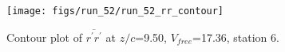 \begin{figure}[H]
\centering
\texttt{[image: figs/run\_52/run\_52\_rr\_contour]}
\caption{Contour plot of $\overline{r^\prime r^\prime}$ at $z/c$=9.50, $V_{free}$=17.36, station 6.}
\end{figure}


